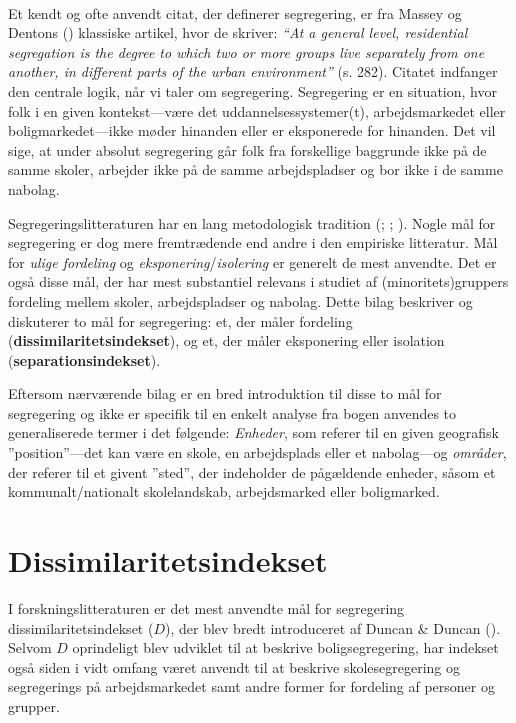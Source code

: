 \documentclass[
]{book}
\begin{document}
~~~~

Et kendt og ofte anvendt citat, der definerer segregering, er fra Massey og Dentons () klassiske artikel, hvor de skriver: \emph{``At a general level, residential segregation is the degree to which two or more groups live separately from one another, in different parts of the urban environment''} (s. 282). Citatet indfanger den centrale logik, når vi taler om segregering. Segregering er en situation, hvor folk i en given kontekst---være det uddannelsessystemer(t), arbejdsmarkedet eller boligmarkedet---ikke møder hinanden eller er eksponerede for hinanden. Det vil sige, at under absolut segregering går folk fra forskellige baggrunde ikke på de samme skoler, arbejder ikke på de samme arbejdspladser og bor ikke i de samme nabolag.

Segregeringslitteraturen har en lang metodologisk tradition (; ; ). Nogle mål for segregering er dog mere fremtrædende end andre i den empiriske litteratur. Mål for \emph{ulige fordeling} og \emph{eksponering}/\emph{isolering} er generelt de mest anvendte. Det er også disse mål, der har mest substantiel relevans i studiet af (minoritets)gruppers fordeling mellem skoler, arbejdspladser og nabolag. Dette bilag beskriver og diskuterer to mål for segregering: et, der måler fordeling (\textbf{dissimilaritetsindekset}), og et, der måler eksponering eller isolation (\textbf{separationsindekset}).

Eftersom nærværende bilag er en bred introduktion til disse to mål for segregering og ikke er specifik til en enkelt analyse fra bogen anvendes to generaliserede termer i det følgende: \emph{Enheder}, som referer til en given geografisk ''position''---det kan være en skole, en arbejdsplads eller et nabolag---og \emph{områder}, der referer til et givent ''sted'', der indeholder de pågældende enheder, såsom et kommunalt/nationalt skolelandskab, arbejdsmarked eller boligmarked.

\section{Dissimilaritetsindekset}\label{dissimkap}

I forskningslitteraturen er det mest anvendte mål for segregering dissimilaritetsindekset (\(D\)), der blev bredt introduceret af Duncan \& Duncan (). Selvom \(D\) oprindeligt blev udviklet til at beskrive boligsegregering, har indekset også siden i vidt omfang været anvendt til at beskrive skolesegregering og segregerings på arbejdsmarkedet samt andre former for fordeling af personer og grupper.
\end{document}
